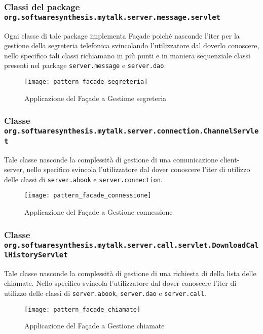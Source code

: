\subsubsection*{Classi del package \texttt{org.softwaresynthesis.mytalk.server.message.servlet}}

Ogni classe di tale package implementa Façade poiché nasconde l'iter per la gestione della segreteria telefonica svincolando l'utilizzatore dal doverlo conoscere, nello specifico tali classi richiamano in più punti e in maniera sequenziale classi presenti nel package \texttt{server.message} e \texttt{server.dao}.

\begin{figure}[H]
  \centering
  \texttt{[image: pattern\_facade\_segreteria]}
  \caption{Applicazione del  Façade a \textsf{Gestione segreteria}}\label{fig:facadeaddressbook2}
\end{figure}

\subsubsection*{Classe \texttt{org.softwaresynthesis.mytalk.server.connection.ChannelServlet}}

Tale classe nasconde la complessità di gestione di una comunicazione client-server, nello specifico svincola l'utilizzatore dal dover conoscere l'iter di utilizzo delle classi di \texttt{server.abook} e \texttt{server.connection}.

\begin{figure}[H]
  \centering
     \texttt{[image: pattern\_facade\_connessione]}
  \caption{Applicazione del  Façade a \textsf{Gestione connessione}}\label{fig:facadeconnection}
\end{figure}

\subsubsection*{Classe \texttt{org.softwaresynthesis.mytalk.server.call.servlet.DownloadCallHistoryServlet}}

Tale classe nasconde la complessità di gestione di una richiesta di  della lista delle chiamate. Nello specifico svincola l'utilizzatore dal dover conoscere l'iter di utilizzo delle classi di \texttt{server.abook}, \texttt{server.dao} e \texttt{server.call}.

\begin{figure}[H]
  \centering
   \texttt{[image: pattern\_facade\_chiamate]}
  \caption{Applicazione del  Façade a \textsf{Gestione chiamate}}\label{fig:facadestate}
\end{figure}


